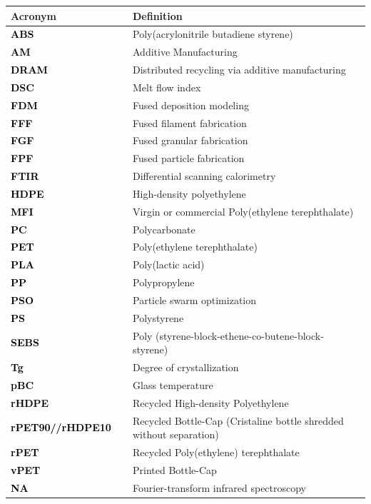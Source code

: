 \documentclass[
  12pt,
]{article}
\begin{document}
\begin{tabular}{>{}ll}
\toprule
Acronym & Definition\\
\midrule
\textcolor{black}{\textbf{ABS }} & Poly(acrylonitrile butadiene styrene)  \\
\textcolor{black}{\textbf{AM }} & Additive Manufacturing \\
\textcolor{black}{\textbf{DRAM }} & Distributed recycling via additive manufacturing \\
\textcolor{black}{\textbf{DSC }} & Melt flow index \\
\textcolor{black}{\textbf{FDM }} & Fused deposition modeling \\
\textcolor{black}{\textbf{FFF }} & Fused filament fabrication \\
\textcolor{black}{\textbf{FGF }} & Fused granular fabrication \\
\textcolor{black}{\textbf{FPF }} & Fused particle fabrication \\
\textcolor{black}{\textbf{FTIR }} & Differential scanning calorimetry  \\
\textcolor{black}{\textbf{HDPE }} & High-density polyethylene \\
\textcolor{black}{\textbf{MFI }} & Virgin or commercial Poly(ethylene terephthalate) \\
\textcolor{black}{\textbf{PC }} & Polycarbonate \\
\textcolor{black}{\textbf{PET }} & Poly(ethylene terephthalate) \\
\textcolor{black}{\textbf{PLA }} & Poly(lactic acid) \\
\textcolor{black}{\textbf{PP }} & Polypropylene  \\
\textcolor{black}{\textbf{PSO }} & Particle swarm optimization \\
\textcolor{black}{\textbf{PS }} & Polystyrene \\
\textcolor{black}{\textbf{SEBS }} & Poly (styrene-block-ethene-co-butene-block-styrene) \\
\textcolor{black}{\textbf{Tg }} & Degree of crystallization \\
\textcolor{black}{\textbf{pBC }} & Glass temperature \\
\textcolor{black}{\textbf{rHDPE }} & Recycled High-density Polyethylene \\
\textcolor{black}{\textbf{rPET90//rHDPE10  }} & Recycled Bottle-Cap (Cristaline bottle shredded without separation) \\
\textcolor{black}{\textbf{rPET }} & Recycled Poly(ethylene) terephthalate \\
\textcolor{black}{\textbf{vPET }} & Printed Bottle-Cap \\
\textcolor{black}{\textbf{NA}} & Fourier-transform infrared spectroscopy  \\
\bottomrule
\end{tabular}
\endgroup{}
\end{document}
